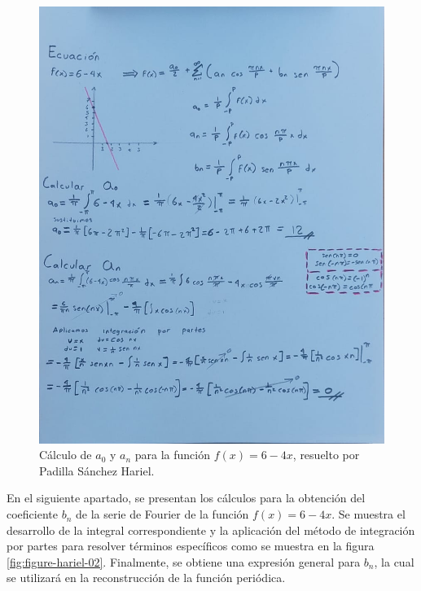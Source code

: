 {%
    \begin{figure}[H]
        \centering
        \includegraphics[width=\linewidth]{Figures/fourierHariel/fase1/funcion 1.jpg}
        \caption[Cálculo de \(a_0\) y \(a_n\) para \(f(x) = 6 - 4x\)]{Cálculo de \(a_0\) y \(a_n\) para la función \(f(x) = 6 - 4x\), resuelto por Padilla Sánchez Hariel.}
        \label{fig:figure-hariel-01}
    \end{figure}

    En el siguiente apartado, se presentan los cálculos para la obtención del coeficiente \(b_n\) de la serie de Fourier de la función \(f(x)=6-4x\). Se muestra el desarrollo de la integral correspondiente y la aplicación del método de integración por partes para resolver términos específicos como se muestra en la figura \ref{fig:figure-hariel-02}. Finalmente, se obtiene una expresión general para \(b_n\), la cual se utilizará en la reconstrucción de la función periódica.

}
